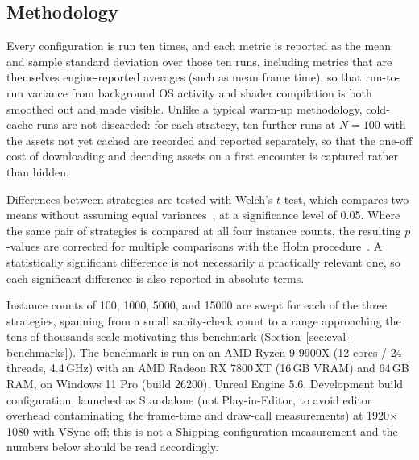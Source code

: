 \subsection{Methodology}
\label{sec:eval-method}

Every configuration is run ten times, and each metric is reported as the mean and sample standard deviation over those ten runs, including metrics that are themselves engine-reported averages (such as mean frame time), so that run-to-run variance from background OS activity and shader compilation is both smoothed out and made visible. Unlike a typical warm-up methodology, cold-cache runs are not discarded: for each strategy, ten further runs at \(N=100\) with the assets not yet cached are recorded and reported separately, so that the one-off cost of downloading and decoding assets on a first encounter is captured rather than hidden.

Differences between strategies are tested with Welch's \(t\)-test, which compares two means without assuming equal variances~\cite{welch1947}, at a significance level of 0.05. Where the same pair of strategies is compared at all four instance counts, the resulting \(p\)-values are corrected for multiple comparisons with the Holm procedure~\cite{holm1979}. A statistically significant difference is not necessarily a practically relevant one, so each significant difference is also reported in absolute terms.

Instance counts of 100, 1000, 5000, and 15000 are swept for each of the three strategies, spanning from a small sanity-check count to a range approaching the tens-of-thousands scale motivating this benchmark (Section~\ref{sec:eval-benchmarks}). The benchmark is run on an AMD Ryzen 9 9900X (12 cores / 24 threads, 4.4\,GHz) with an AMD Radeon RX 7800\,XT (16\,GB VRAM) and 64\,GB RAM, on Windows 11 Pro (build 26200), Unreal Engine 5.6, Development build configuration, launched as Standalone (not Play-in-Editor, to avoid editor overhead contaminating the frame-time and draw-call measurements) at 1920\(\times\)1080 with VSync off; this is not a Shipping-configuration measurement and the numbers below should be read accordingly.

